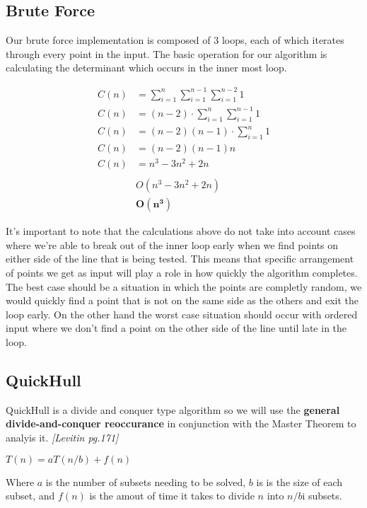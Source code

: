 \documentclass{article}
\begin{document}
{  \subsection{Brute Force}
  Our brute force implementation is composed of 3 loops, each of which iterates through every point in the input. The basic operation for our algorithm is calculating the determinant which occurs in the inner most loop.
  \begin{center}
    \begin{align*}
      C(n) &= \sum\limits_{i=1}^n \sum\limits_{i=1}^{n-1} \sum\limits_{i=1}^{n-2} 1 \\
      C(n) &= (n-2) \cdot \sum\limits_{i=1}^n \sum\limits_{i=1}^{n-1}1 \\ 
      C(n) &= (n-2)(n-1) \cdot \sum\limits_{i=1}^n 1 \\
      C(n) &= (n-2)(n-1)n \\
      C(n) &= n^3 - 3n^2 + 2n \\ \\
           &O(n^3 -3n^2 +2n) \\
           &\bm{O(n^3)}
    \end{align*}
  \end{center}
It's important to note that the calculations above do not take into account cases where we're able to break out of the inner loop early when we find points on either side of the line that is being tested.  This means that specific arrangement of points we get as input will play a role in how quickly the algorithm completes.  The best case should be a situation in which the points are completly random, we would quickly find a point that is not on the same side as the others and exit the loop early.  On the other hand the worst case situation should occur with ordered input where we don't find a point on the other side of the line until late in the loop.
  \subsection{QuickHull}
  QuickHull is a divide and conquer type algorithm so we will use the \textbf{general divide-and-conquer reoccurance} in conjunction with the Master Theorem to analyis it. \textit{[Levitin pg.171]}

  \begin{center}
    $T(n) = aT(n/b) + f(n)$
  \end{center}

  Where $a$ is the number of subsets needing to be solved, $b$ is is the size of each subset, and $f(n)$ is the amout of time it takes to divide $n$ into $n/b$i subsets. \\ \\

}
\end{document}

